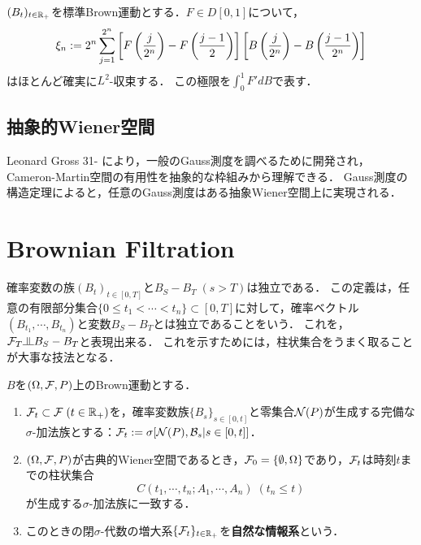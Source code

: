 \documentclass[uplatex,dvipdfmx]{jsreport}
\begin{document}
\begin{lemma}
    $(B_t)_{t\in\mathbb{R}_+}$を標準Brown運動とする．$F\in D[0,1]$について，
    \[\xi_n:=2^n\sum^{2^n}_{j=1}\left[F\left(\frac{j}{2^n}\right)-F\left(\frac{j-1}{2}\right)\right]\left[B\left(\frac{j}{2^n}\right)-B\left(\frac{j-1}{2^n}\right)\right]\]
    はほとんど確実に$L^2$-収束する．
    この極限を$\int^1_0F'dB$で表す．
\end{lemma}

\subsection{抽象的Wiener空間}

\begin{tcolorbox}[colframe=ForestGreen, colback=ForestGreen!10!white,breakable,colbacktitle=ForestGreen!40!white,coltitle=black,fonttitle=\bfseries\sffamily,
title=]
    Leonard Gross 31- により，一般のGauss測度を調べるために開発され，Cameron-Martin空間の有用性を抽象的な枠組みから理解できる．
    Gauss測度の構造定理によると，任意のGauss測度はある抽象Wiener空間上に実現される．
\end{tcolorbox}

\section{Brownian Filtration}

\begin{tcolorbox}[colframe=ForestGreen, colback=ForestGreen!10!white,breakable,colbacktitle=ForestGreen!40!white,coltitle=black,fonttitle=\bfseries\sffamily,
title=]
    確率変数の族$(B_t)_{t\in[0,T]}$と$B_S-B_T\;(s>T)$は独立である．
    この定義は，任意の有限部分集合$\{0\le t_1<\cdots<t_n\}\subset[0,T]$に対して，確率ベクトル$(B_{t_1},\cdots,B_{t_n})$と変数$B_S-B_T$とは独立であることをいう．
    これを，$\F_T\indep B_S-B_T$と表現出来る．
    これを示すためには，柱状集合をうまく取ることが大事な技法となる．
\end{tcolorbox}

\begin{definition}
    $B$を$(\Omega,\mathcal{F},P)$上のBrown運動とする．
    \begin{enumerate}
        \item $\mathcal{F}_t\subset\mathcal{F}\;(t\in\mathbb{R}_+)$を，確率変数族$\{B_s\}_{s\in[0,t]}$と零集合$\mathcal{N}(P)$が生成する完備な$\sigma$-加法族とする：$\mathcal{F}_t:=\sigma[\mathcal{N}(P),\mathcal{B}_s|s\in[0,t]]$．
        \item $(\Omega,\mathcal{F},P)$が古典的Wiener空間であるとき，$\mathcal{F}_0=\{\emptyset,\Omega\}$であり，$\mathcal{F}_t$は時刻$t$までの柱状集合
        \[C(t_1,\cdots,t_n;A_1,\cdots,A_n)\;(t_n\le t)\]
        が生成する$\sigma$-加法族に一致する．
        \item このときの閉$\sigma$-代数の増大系$\{\mathcal{F}_t\}_{t\in\mathbb{R}_+}$を\textbf{自然な情報系}という．
    \end{enumerate}
\end{definition}
\end{document}
